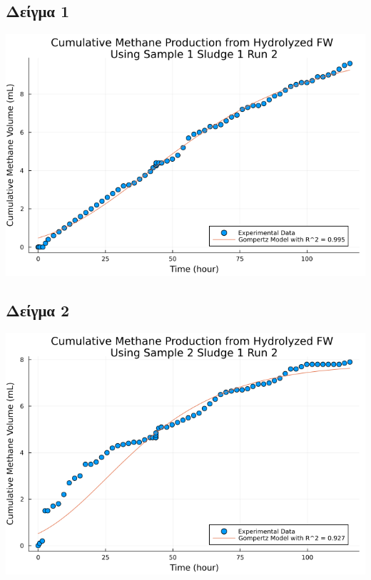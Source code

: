 \documentclass[11pt]{article}
\begin{document}
\subsection{Δείγμα 1}
\label{sec:orgd2891c1}
\begin{center}
\includegraphics[width=.9\linewidth]{../plots/BMPs/Hydrolyzed FW/methane_kinetics_hydrolysate_1_s1_r2_hour.png}
\end{center}

\subsection{Δείγμα 2}
\label{sec:org4042681}
\begin{center}
\includegraphics[width=.9\linewidth]{../plots/BMPs/Hydrolyzed FW/methane_kinetics_hydrolysate_2_s1_r2_hour.png}
\end{center}
\end{document}
